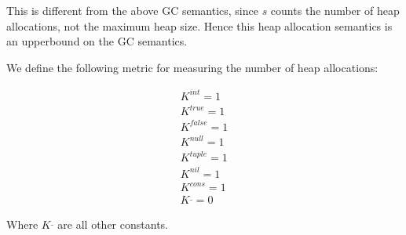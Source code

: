 \documentclass[11pt]{article}
\begin{document}
This is different from the above GC semantics, since $s$ counts the number of heap allocations, not the maximum heap size.
Hence this heap allocation semantics is an upperbound on the GC semantics.

We define the following metric for measuring the number of heap allocations:

\begin{align*}
  K^{int} = 1\\
  K^{true} = 1\\
  K^{false} = 1\\
  K^{null} = 1\\
  K^{tuple} = 1\\
  K^{nil} = 1\\
  K^{cons} = 1\\
  K^{\_} = 0
\end{align*}

Where $K^{\_}$ are all other constants.
\end{document}

